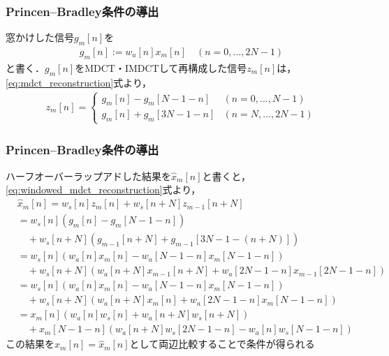 \documentclass[14pt,xcolor=dvipsnames,table,dvipdfmx]{beamer}
\begin{document}
\begin{frame}[c]
    \frametitle{Princen--Bradley条件の導出}
    窓かけした信号$g_{m}[n]$を
    \begin{align}
        g_{m}[n] := w_{a}[n] x_{m}[n] \quad (n = 0, ..., 2N-1)
    \end{align}
    と書く．$g_{m}[n]$をMDCT・IMDCTして再構成した信号$z_{m}[n]$は，\eqref{eq:mdct_reconstruction}式より，
    \small
    \begin{align}
        z_{m}[n] = \left\{ \begin{array}{ll}
            g_{m}[n] - g_{m}[N - 1 - n] & (n = 0, ..., N - 1) \\
            g_{m}[n] + g_{m}[3N - 1 - n] & (n = N, ..., 2N - 1)
        \end{array} \right. \label{eq:windowed_mdct_reconstruction}
    \end{align}
\end{frame}

\begin{frame}[c]
    \frametitle{Princen--Bradley条件の導出}
    ハーフオーバーラップアドした結果を$\hat{x}_{m}[n]$と書くと，\eqref{eq:windowed_mdct_reconstruction}式より，
    \footnotesize
    \begin{align*}
        &\hat{x}_{m}[n] = w_{s}[n]z_{m}[n] + w_{s}[n + N]z_{m-1}[n + N] \\
        &= w_{s}[n] (g_{m}[n] - g_{m}[N - 1 - n]) \\
        &\quad + w_{s}[n + N] (g_{m-1}[n + N] + g_{m-1}[3N - 1 - (n + N)]) \\
        &= w_{s}[n] (w_{a}[n] x_{m}[n] - w_{a}[N - 1 - n]x_{m}[N - 1 - n]) \\
        &\quad + w_{s}[n + N] (w_{a}[n + N] x_{m-1}[n + N] + w_{a}[2N - 1 - n]x_{m-1}[2N - 1 - n]) \\
        &= w_{s}[n] (w_{a}[n] x_{m}[n] - w_{a}[N - 1 - n]x_{m}[N - 1 - n]) \\
        &\quad + w_{s}[n + N] (w_{a}[n + N] x_{m}[n] + w_{a}[2N - 1 - n]x_{m}[N - 1 - n]) \\
        &= x_{m}[n](w_{a}[n] w_{s}[n] + w_{a}[n + N]w_{s}[n + N]) \\
        &\quad + x_{m}[N - 1 - n](w_{a}[n + N] w_{s}[2N - 1 - n] - w_{a}[n]w_{s}[N - 1 - n])
    \end{align*}
    \normalsize
    この結果を$x_{m}[n] = \hat{x}_{m}[n]$として両辺比較することで条件が得られる
\end{frame}
\end{document}
